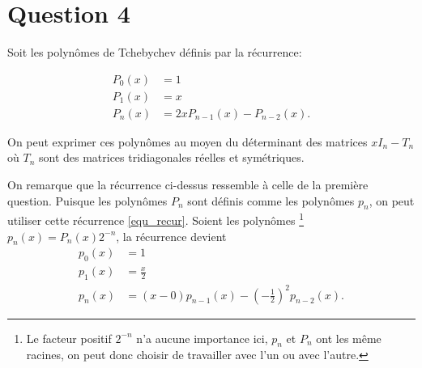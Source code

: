 \section*{Question 4}
Soit les polynômes de Tchebychev définis par la récurrence:

\begin{align*}
  P_0(x) & = 1\\
  P_1(x) & = x\\
  P_n(x) & = 2xP_{n-1}(x) - P_{n-2}(x).
\end{align*}

On peut exprimer ces polynômes au moyen du déterminant des matrices $xI_n - T_n$ où $T_n$ sont des matrices tridiagonales réelles et symétriques.

On remarque que la récurrence ci-dessus ressemble à celle de la première question.
Puisque les polynômes $P_n$ sont définis comme les polynômes $p_n$,
on peut utiliser cette récurrence \eqref{equ_recur}.
Soient les polynômes
\footnote{Le facteur positif $2^{-n}$ n'a aucune importance ici,
$p_n$ et $P_n$ ont les même racines,
on peut donc choisir de travailler avec l'un ou avec l'autre.}
$p_n(x) = P_n(x)2^{-n}$, la récurrence devient
\begin{align*}
  p_0(x) & = 1\\
  p_1(x) & = \frac{x}{2}\\
  p_n(x) & = (x - 0)p_{n-1}(x) - \left(-\frac{1}{2}\right)^2p_{n-2}(x).
\end{align*}

